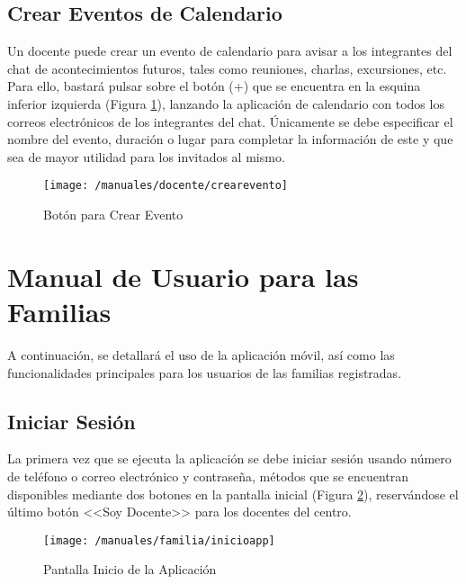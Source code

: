 \clearpage

\subsection*{Crear Eventos de Calendario}
Un docente puede crear un evento de calendario para avisar a los integrantes del chat de acontecimientos futuros, tales como reuniones, charlas, excursiones, etc. Para ello, bastará pulsar sobre el botón (+) que se encuentra en la esquina inferior izquierda (Figura \ref{fig:creareventodocente}), lanzando la aplicación de calendario con todos los correos electrónicos de los integrantes del chat. Únicamente se debe especificar el nombre del evento, duración o lugar para completar la información de este y que sea de mayor utilidad para los invitados al mismo.

\begin{figure}[!h]
	\begin{center}
		\texttt{[image: /manuales/docente/crearevento]}
		\caption{Botón para Crear Evento}
		\label{fig:creareventodocente}
	\end{center}
\end{figure}

\clearpage

\section*{Manual de Usuario para las Familias}
A continuación, se detallará el uso de la aplicación móvil, así como las funcionalidades principales para los usuarios de las familias registradas.

\subsection*{Iniciar Sesión}
La primera vez que se ejecuta la aplicación se debe iniciar sesión usando número de teléfono o correo electrónico y contraseña, métodos que se encuentran disponibles mediante dos botones en la pantalla inicial (Figura \ref{fig:inicioappfamilia}), reservándose el último botón <<Soy Docente>> para los docentes del centro.

\begin{figure}[!h]
	\begin{center}
		\texttt{[image: /manuales/familia/inicioapp]}
		\caption{Pantalla Inicio de la Aplicación}
		\label{fig:inicioappfamilia}
	\end{center}
\end{figure}


